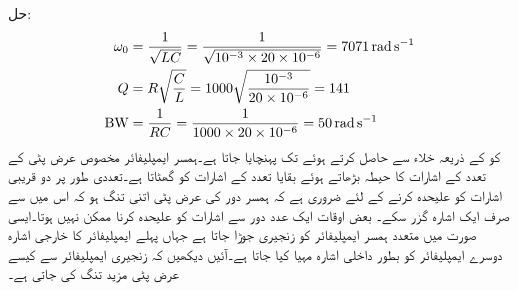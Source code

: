 حل:
\begin{align*}
\omega_0&=\frac{1}{\sqrt{LC}}=\frac{1}{\sqrt{10^{-3}\times 20 \times 10^{-6}}}=\SI{7071}{\radian\per\second}\\
Q&=R\sqrt{\frac{C}{L}}=1000\sqrt{\frac{10^{-3}}{20\times 10^{-6}}}=141\\
{{\textup{BW}}}&=\frac{1}{RC}=\frac{1}{1000\times 20\times 10^{-6}}=\SI{50}{\radian\per\second}
\end{align*}
 کو  کے ذریعہ خلاء سے حاصل کرتے ہوئے  تک پہنچایا جاتا ہے۔ہمسر ایمپلیفائر مخصوص  عرض پٹی کے تعدد کے اشارات کا حیطہ بڑھاتے ہوئے بقایا تعدد کے اشارات کو گھٹاتا ہے۔تعددی طور پر دو قریبی اشارات کو علیحدہ کرنے کے لئے ضروری ہے کہ ہمسر دور کی عرض پٹی اتنی تنگ ہو کہ اس میں سے صرف ایک اشارہ گزر سکے۔ بعض اوقات ایک عدد  دور سے اشارات کو علیحدہ کرنا ممکن نہیں ہوتا۔ایسی صورت میں متعدد ہمسر ایمپلیفائر کو زنجیری جوڑا جاتا ہے جہاں پہلے ایمپلیفائر کا خارجی اشارہ دوسرے ایمپلیفائر کو بطور داخلی اشارہ مہیا کیا جاتا ہے۔آئیں دیکھیں کہ زنجیری ایمپلیفائر سے کیسے عرض پٹی مزید تنگ کی جاتی ہے۔

